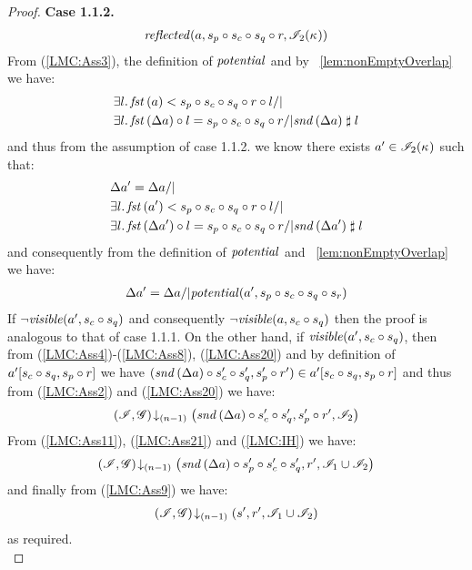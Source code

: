 \begin{lemma}
\begin{proof}
\noindent\textbf{Case 1.1.2.}
\[
\begin{array}{l l}
	\mathit{reflected}(a, s_p \circ s_c \circ s_q \circ r, \mathscr{I}_{2}(\kappa_{})) 
\end{array}
\]
From (\ref{LMC:Ass3}), the definition of $\mathit{potential}$ and by \lem~\ref{lem:nonEmptyOverlap} we have:
%
\begin{align*}
	& \exsts{l} \fst{a} < s_p \composeL s_c \composeL s_q \composeL r \composeL l /| \null\\
	& \exsts{l} \fst{\updateFP{a}} \composeL l = s_p \composeL s_c \composeL s_q \composeL r /| \snd{\updateFP{a}} \compatible l
\end{align*}
%
and thus from the assumption of case 1.1.2. we know there exists $a' \in \mathscr{I}_2(\kappa_{})$ such that: 
%
\begin{align*}
	& \updateFP{a'} = \updateFP{a} /|\\
	& \exsts{l} \fst{a'} < s_p \composeL s_c \composeL s_q \composeL r \composeL l /| \null\\
	& \exsts{l} \fst{\updateFP{a'}} \composeL l = s_p \composeL s_c \composeL s_q \composeL r /| \snd{\updateFP{a'}} \compatible l
\end{align*}
%
and consequently from the definition of $\mathit{potential}$ and \lem~\ref{lem:nonEmptyOverlap} we have: 
%
\begin{align}
	\Delta {a'} = \Delta {a} /| \mathit{potential}(a', s_p \circ s_c \circ s_q \circ s_r) \label{LMC:Ass20}
\end{align}
If $\neg\mathit{visible}(a', s_c \circ s_q)$ and consequently $\neg\mathit{visible}(a, s_c \circ s_q)$ then the proof is analogous to that of case 1.1.1. On the other hand, if $\mathit{visible}(a', s_c \circ s_q)$, then from (\ref{LMC:Ass4})-(\ref{LMC:Ass8}), (\ref{LMC:Ass20}) and by definition of $a'[s_c \circ s_q, s_p \circ r]$ we have $(\mathit{snd}\left(\Delta {a}\right) \circ s_c' \circ s_q', s_p' \circ r') \in a'[s_c \circ s_q, s_p \circ r]$ and thus from (\ref{LMC:Ass2}) and (\ref{LMC:Ass20}) we have:
%
\begin{align}
	\left(\mathscr{I}, \mathscr{G}\right) \!\downarrow_{(n-1)} \left(\mathit{snd}\left(\Delta {a}\right) \circ s_c' \circ s_q', s_p' \circ r', \mathscr{I}_2\right) \label{LMC:Ass21}
\end{align}
From (\ref{LMC:Ass11}), (\ref{LMC:Ass21}) and (\ref{LMC:IH}) we have: 
%
\begin{align*}
	\left(\mathscr{I}, \mathscr{G}\right) \!\downarrow_{(n-1)} \left(\mathit{snd}\left(\Delta {a}\right) \circ s_p' \circ s_c' \circ s_q', r', \mathscr{I}_1 \cup \mathscr{I}_2\right) 
\end{align*}
and finally from (\ref{LMC:Ass9}) we have: 
%
\begin{align*}
	\left(\mathscr{I}, \mathscr{G}\right) \!\downarrow_{(n-1)} \left(s', r', \mathscr{I}_1 \cup \mathscr{I}_2\right) 
\end{align*}
as required.\\
%
%
%
%
%









\end{proof}
\end{lemma}
